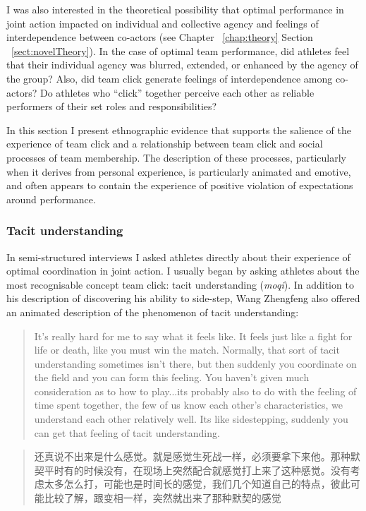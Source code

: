 \begin{CJK}{UTF8}{gbsn}
I was also interested in the theoretical possibility that optimal performance in joint action impacted on individual and collective agency and feelings of interdependence between co-actors (see Chapter ~\ref{chap:theory} Section ~\ref{sect:novelTheory}).  In the case of optimal team performance, did athletes feel that their individual agency was blurred, extended, or enhanced by the agency of the group?  Also, did team click generate feelings of interdependence among co-actors?  Do athletes who ``click'' together perceive each other as reliable performers of their set roles and responsibilities?

In this section I present ethnographic evidence that supports the salience of the experience of team click and a relationship between team click and social processes of team membership.  The description of these processes, particularly when it derives from personal experience, is particularly animated and emotive, and often appears to contain the experience of positive violation of expectations around performance.

\subsubsection{Tacit understanding}
In semi-structured interviews I asked athletes directly about their experience of optimal coordination in joint action.  I usually began by asking athletes about the most recognisable concept team click: tacit understanding (\textit{moqi}).  In addition to his description of discovering his ability to side-step, Wang Zhengfeng also offered an animated description of the phenomenon of tacit understanding:

  \begin{quote}
    It’s really hard for me to say what it feels like.  It feels just like a fight for life or death, like you must win the match.  Normally, that sort of tacit understanding sometimes isn’t there, but then suddenly you coordinate on the field and you can form this feeling.  You haven't given much consideration as to how to play...its probably also to do with the feeling of time spent together, the few of us know each other’s characteristics, we understand each other relatively well.  Its like sidestepping, suddenly you can get that feeling of tacit understanding.
  \end{quote}

  \begin{quote}
    还真说不出来是什么感觉。就是感觉生死战一样，必须要拿下来他。那种默契平时有的时候没有，在现场上突然配合就感觉打上来了这种感觉。没有考虑太多怎么打，可能也是时间长的感觉，我们几个知道自己的特点，彼此可能比较了解，跟变相一样，突然就出来了那种默契的感觉 
  \end{quote}


\end{CJK}
